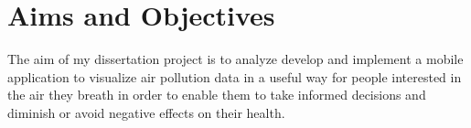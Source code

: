 \section{Aims and Objectives}
The aim of my dissertation project is to analyze develop and implement a mobile application to visualize air pollution data in a useful way for people interested in the air they breath in order to enable them to take informed decisions and diminish or avoid negative effects on their health.